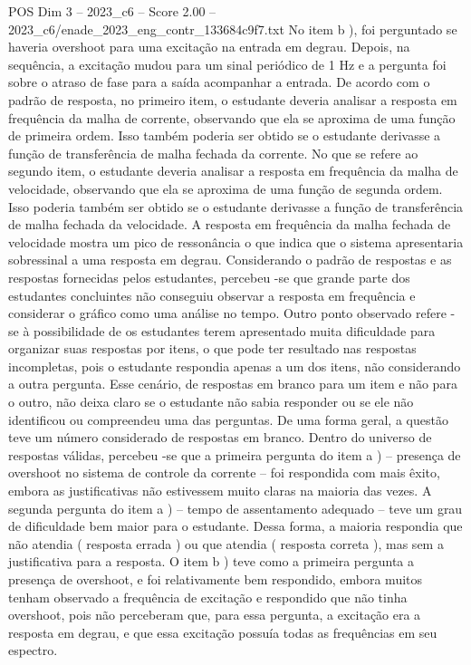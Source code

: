 \begin{textsample}{POS Dim 3 – 2023\_c6 – Score 2.00 – 2023\_c6/enade\_2023\_eng\_contr\_133684c9f7.txt}
No item b ), foi perguntado se haveria overshoot para uma excitação na entrada em degrau.
Depois, na sequência, a excitação mudou para um sinal periódico de 1 Hz e a pergunta foi sobre o atraso de fase para a saída acompanhar a entrada.
De acordo com o padrão de resposta, no primeiro item, o estudante deveria analisar a resposta em frequência da malha de corrente, observando que ela se aproxima de uma função de primeira ordem.
Isso também poderia ser obtido se o estudante derivasse a função de transferência de malha fechada da corrente.
No que se refere ao segundo item, o estudante deveria analisar a resposta em frequência da malha de velocidade, observando que ela se aproxima de uma função de segunda ordem.
Isso poderia também ser obtido se o estudante derivasse a função de transferência de malha fechada da velocidade.
A resposta em frequência da malha fechada de velocidade mostra um pico de ressonância o que indica que o sistema apresentaria sobressinal a uma resposta em degrau.
Considerando o padrão de respostas e as respostas fornecidas pelos estudantes, percebeu -se que grande parte dos estudantes concluintes não conseguiu observar a resposta em frequência e considerar o gráfico como uma análise no tempo.
Outro ponto observado refere -se à possibilidade de os estudantes terem apresentado muita dificuldade para organizar suas respostas por itens, o que pode ter resultado nas respostas incompletas, pois o estudante respondia apenas a um dos itens, não considerando a outra pergunta.
Esse cenário, de respostas em branco para um item e não para o outro, não deixa claro se o estudante não sabia responder ou se ele não identificou ou compreendeu uma das perguntas.
De uma forma geral, a questão teve um número considerado de respostas em branco.
Dentro do universo de respostas válidas, percebeu -se que a primeira pergunta do item a ) – presença de overshoot no sistema de controle da corrente – foi respondida com mais êxito, embora as justificativas não estivessem muito claras na maioria das vezes.
A segunda pergunta do item a ) – tempo de assentamento adequado – teve um grau de dificuldade bem maior para o estudante.
Dessa forma, a maioria respondia que não atendia ( resposta errada ) ou que atendia ( resposta correta ), mas sem a justificativa para a resposta.
O item b ) teve como a primeira pergunta a presença de overshoot, e foi relativamente bem respondido, embora muitos tenham observado a frequência de excitação e respondido que não tinha overshoot, pois não perceberam que, para essa pergunta, a excitação era a resposta em degrau, e que essa excitação possuía todas as frequências em seu espectro.

\end{textsample}
